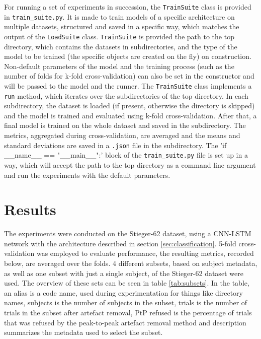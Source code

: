 \documentclass[english, he, bc, kiv, iso690alph, viewonly]{fasthesis}
\begin{document}
For running a set of experiments in succession, the \texttt{TrainSuite} class is provided in \texttt{train\_suite.py}. It is made to train models of a specific architecture on multiple datasets, structured and saved in a specific way, which matches the output of the \texttt{LoadSuite} class. \texttt{TrainSuite} is provided the path to the top directory, which contains the datasets in subdirectories, and the type of the model to be trained (the specific objects are created on the fly) on construction. Non-default parameters of the model and the training process (such as the number of folds for k-fold cross-validation) can also be set in the constructor and will be passed to the model and the runner. The \texttt{TrainSuite} class implements a \texttt{run} method, which iterates over the subdirectories of the top directory. In each subdirectory, the dataset is loaded (if present, otherwise the directory is skipped) and the model is trained and evaluated using k-fold cross-validation. After that, a final model is trained on the whole dataset and saved in the subdirectory. The metrics, aggregated during cross-validation, are averaged and the means and standard deviations are saved in a \texttt{.json} file in the subdirectory. The \command'if __name__ == "__main__":' block of the \texttt{train\_suite.py} file is set up in a way, which will accept the path to the top directory as a command line argument and run the experiments with the default parameters.

\chapter{Results}
\label{chap:results}


The experiments were conducted on the Stieger-62 dataset, using a CNN-LSTM network with the architecture described in section \ref{sec:classification}. 5-fold cross-validation was employed to evaluate performance, the resulting metrics, recorded below, are averaged over the folds. 4 different subsets, based on subject metadata, as well as one subset with just a single subject, of the Stieger-62 dataset were used. The overview of these sets can be seen in table \ref{tab:subsets}. In the table, an alias is a code name, used during experimentation for things like directory names, subjects is the number of subjects in the subset, trials is the number of trials in the subset after artefact removal, PtP refused is the percentage of trials that was refused by the peak-to-peak artefact removal method and description summarizes the metadata used to select the subset.
\end{document}
